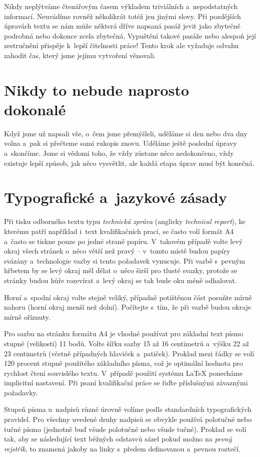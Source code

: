 Nikdy neplýtváme čtenářovým časem výkladem triviálních a~nepodstatných informací. Neuvádíme rovněž několikrát totéž jen jinými slovy. Při pozdějších úpravách textu se nám může některá dříve napsaná pasáž jevit jako zbytečně podrobná nebo dokonce zcela zbytečná. Vypuštění takové pasáže nebo alespoň její zestručnění přispěje k~lepší čitelnosti práce! Tento krok ale vyžaduje odvahu zahodit čas, který jsme jejímu vytvoření věnovali. 


\chapter{Nikdy to nebude naprosto dokonalé}
Když jsme už napsali vše, o~čem jsme přemýšleli, uděláme si den nebo dva dny volna a~pak si přečteme sami rukopis znovu. Uděláme ještě poslední úpravy a~skončíme. Jsme si vědomi toho, že vždy zůstane něco nedokončeno, vždy existuje lepší způsob, jak něco vysvětlit, ale každá etapa úprav musí být konečná.


\chapter{Typografické a~jazykové zásady}
Při tisku odborného textu typu {\it technická zpráva} (anglicky {\it technical report}), ke kterému patří například i~text kvalifikačních prací, se často volí formát A4 a~často se tiskne pouze po jedné straně papíru. V~takovém případě volte levý okraj všech stránek o~něco větší než pravý -- v~tomto místě budou papíry svázány a~technologie vazby si tento požadavek vynucuje. Při vazbě s~pevným hřbetem by se levý okraj měl dělat o~něco širší pro tlusté svazky, protože se stránky budou hůře rozevírat a~levý okraj se tak bude oku méně odhalovat.

Horní a~spodní okraj volte stejně veliký, případně potištěnou část posuňte mírně nahoru (horní okraj menší než dolní). Počítejte s~tím, že při vazbě budou okraje mírně oříznuty.

Pro sazbu na stránku formátu A4 je vhodné používat pro základní text písmo stupně (velikosti) 11 bodů. Volte šířku sazby 15 až 16 centimetrů a~výšku 22 až 23 centimetrů (včetně případných hlaviček a~patiček). Proklad mezi řádky se volí 120 procent stupně použitého základního písma, což je optimální hodnota pro rychlost čtení souvislého textu. V~případě použití systému LaTeX ponecháme implicitní nastavení. Při psaní kvalifikační práce se řiďte příslušnými závaznými požadavky.

Stupeň písma u~nadpisů různé úrovně volíme podle standardních typografických pravidel. 
Pro všechny uvedené druhy nadpisů se obvykle používá polotučné nebo tučné písmo (jednotně buď všude polotučné nebo všude tučné). Proklad se volí tak, aby se následující text běžných odstavců sázel pokud možno na {\it pevný rejstřík}, to znamená jakoby na linky s~předem definovanou a~pevnou roztečí.

